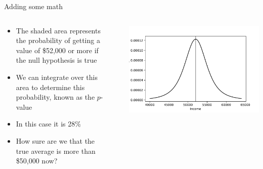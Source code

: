 \begin{frame}{Adding some math}
  \begin{columns}
    \begin{column}{0.5\textwidth}
      \begin{itemize}
        \item The shaded area represents the probability of getting a value of \$52,000 or more if the null hypothesis is true
        \item We can integrate over this area to determine this probability, known as the $p$-value
        \item In this case it is 28\%
        \item How sure are we that the true average is more than \$50,000 now?
      \end{itemize}
    \end{column}~%
    \begin{column}{0.49\textwidth}
      \centering\includegraphics[width=\textwidth]{fig/incdistribution.pdf}
    \end{column}
  \end{columns}
\end{frame}

